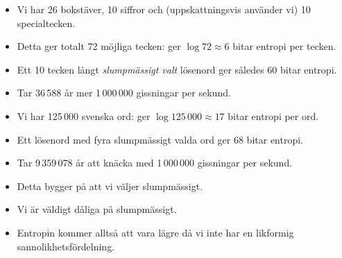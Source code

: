 \documentclass{beamer}
\theoremstyle{definition}
\begin{document}
\begin{frame}{\insertsubsectionhead}
  \begin{itemize}
    \item Vi har 26 bokstäver, 10 siffror och (uppskattningsvis använder vi) 10 
      specialtecken.

    \item Detta ger totalt 72 möjliga tecken: ger \(\log 72\approx 6\) bitar 
      entropi per tecken.

    \item Ett 10 tecken långt \emph{slumpmässigt valt} lösenord ger således 60 
      bitar entropi.

    \item Tar 36\,588 år mer 1\,000\,000 gissningar per sekund.

  \end{itemize}
\end{frame}

\begin{frame}{\insertsubsectionhead}
  \begin{itemize}
    \item Vi har 125\,000 svenska ord: ger \(\log 125\,000\approx 17\) bitar 
      entropi per ord.

    \item Ett lösenord med fyra slumpmässigt valda ord ger 68 bitar entropi.

    \item Tar 9\,359\,078 år att knäcka med 1\,000\,000 gissningar per sekund.

  \end{itemize}
\end{frame}

\begin{frame}{\insertsubsectionhead}
  \begin{itemize}
    \item Detta bygger på att vi väljer slumpmässigt.

    \item Vi är väldigt dåliga på slumpmässigt.

    \item Entropin kommer alltså att vara lägre då vi inte har en likformig 
      sannolikhetsfördelning.

  \end{itemize}
\end{frame}
\end{document}
